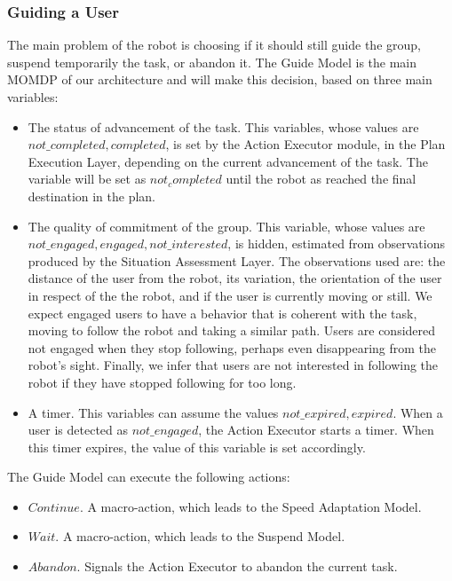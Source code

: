 \subsubsection{Guiding a User}
The main problem of the robot is choosing if it should still guide the group, suspend temporarily the task, or abandon it. The Guide Model is the main MOMDP of our architecture and will make this decision, based on three main variables: 
\begin{itemize}
\item The status of advancement of the task. This variables, whose values are ${not\_completed, completed}$, is set by the Action Executor module, in the Plan Execution Layer, depending on the current advancement of the task. The variable will be set as $not_completed$ until the robot as reached the final destination in the plan. 
\item The quality of commitment of the group. This variable, whose values are ${not\_engaged, engaged, not\_interested}$, is hidden, estimated from observations produced by the Situation Assessment Layer. The observations used are: the distance of the user from the robot, its variation, the orientation of the user in respect of the the robot, and if the user is currently moving or still. We expect engaged users to have a behavior that is coherent with the task, moving to follow the robot and taking a similar path. Users are considered not engaged when they stop following, perhaps even disappearing from the robot's sight. Finally, we infer that users are not interested in following the robot if they have stopped following for too long.
\item A timer. This variables can assume the values ${not\_expired, expired}$. When a user is detected as $not\_engaged$, the Action Executor starts a timer. When this timer expires, the value of this variable is set accordingly.
\end{itemize}

The Guide Model can execute the following actions:
\begin{itemize}
\item $Continue$. A macro-action, which leads to the Speed Adaptation Model.
\item $Wait$. A macro-action, which leads to the Suspend Model.
\item $Abandon$. Signals the Action Executor to abandon the current task.
\end{itemize}

